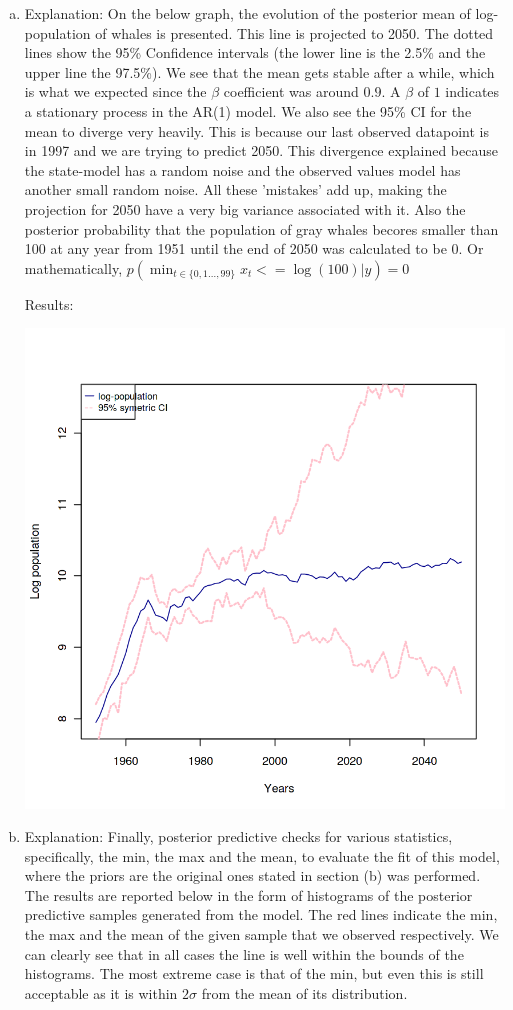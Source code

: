 \documentclass[12pt,a4paper]{article}
\begin{document}
\begin{enumerate}[(a)]
\item
Explanation: On the below graph, the evolution of the posterior mean of log-population of whales is presented. This line is projected to 2050. The dotted lines show the 95\% Confidence intervals (the lower line is the 2.5\% and the upper line the 97.5\%). We see that the mean gets stable after a while, which is what we expected since the $\beta$ coefficient was around $0.9$. A $\beta$ of $1$ indicates a stationary process in the AR(1) model. We also see the 95\% CI for the mean to diverge very heavily. This is because our last observed datapoint is in 1997 and we are trying to predict 2050. This divergence explained because the state-model has a random noise and the observed values model has another small random noise. All these 'mistakes' add up, making the projection for 2050 have a very big variance associated with it.
Also the posterior probability that the population of gray whales becores smaller than 100 at any year from 1951 until the end of 2050 was calculated to be 0. Or mathematically, $p(\min_{t\in \{0,1\ldots,99\}} x_t<=\log(100)|y) = 0$

Results:

\includegraphics[scale=0.25]{./images/1_Figure5_final_plot.png}


\item
Explanation: Finally, posterior predictive checks for various statistics, specifically, the min, the max and the mean, to evaluate the fit of this model, where the priors are the original ones stated in section (b) was performed. The results are reported below in the form of histograms of the posterior predictive samples generated from the model. The red lines indicate the min, the max and the mean of the given sample that we observed respectively. We can clearly see that in all cases the line is well within the bounds of the histograms. The most extreme case is that of the min, but even this is still acceptable as it is within $2 \sigma$ from the mean of its distribution.


\end{enumerate}
\end{document}
